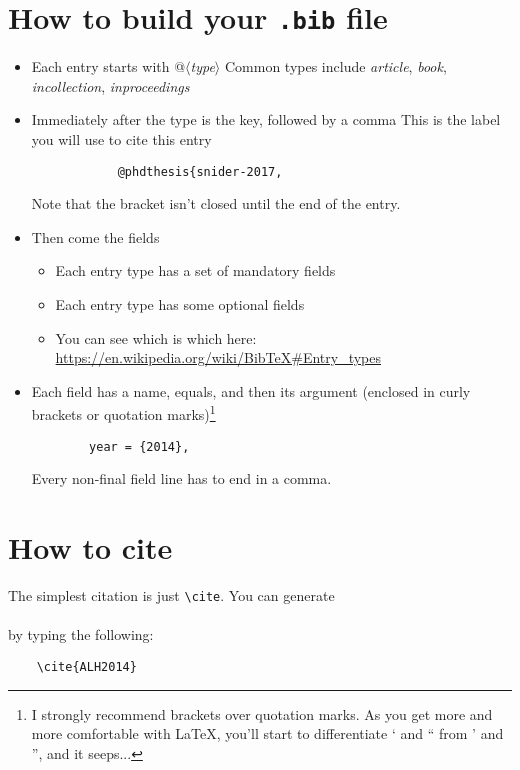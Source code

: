\documentclass{article}
\begin{document}
\section*{How to build your \texttt{.bib} file}
\begin{itemize}
    \item Each entry starts with @$\langle$\textit{type}$\rangle$
        \subitem Common types include \textit{article}, \textit{book}, \textit{incollection}, \textit{inproceedings}\textellipsis
    \item Immediately after the type is the key, followed by a comma
        \subitem This is the label you will use to cite this entry
            \begin{lstlisting}
            @phdthesis{snider-2017,
            \end{lstlisting}
        \subitem Note that the bracket isn't closed until the end of the entry.
    \item Then come the fields
    \begin{itemize}
        \item Each entry type has a set of mandatory fields
        \item Each entry type has some optional fields
        \item You can see which is which here:\\ \url{https://en.wikipedia.org/wiki/BibTeX#Entry_types}
    \end{itemize}
    \item Each field has a name, equals, and then its argument (enclosed in curly brackets or quotation marks)\footnote{I strongly recommend brackets over quotation marks. As you get more and more comfortable with \LaTeX, you'll start to differentiate ` and `` from ' and '', and it seeps...}
    \begin{lstlisting}
        year = {2014},
    \end{lstlisting}
        \subitem Every non-final field line has to end in a comma.
\end{itemize}

\section*{How to cite}

The simplest citation is just \texttt{\textbackslash cite}. You can generate\\
\cite{ALH2014}\\
by typing the following:
\begin{lstlisting}
    \cite{ALH2014}
\end{lstlisting}
\end{document}
